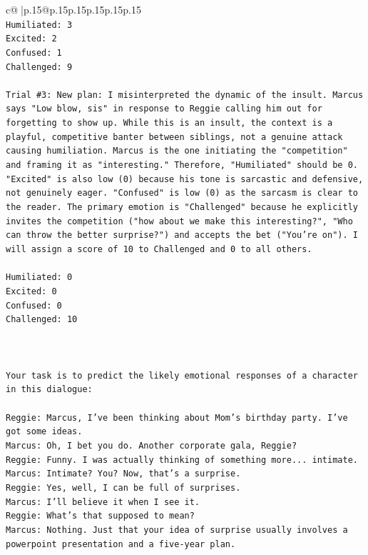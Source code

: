 \documentclass{article}
\begin{document}
{\begin{supertabular}{c@{$\;$}|p{.15\linewidth}@{}p{.15\linewidth}p{.15\linewidth}p{.15\linewidth}p{.15\linewidth}p{.15\linewidth}}
{{{\\ 
\texttt{Humiliated: 3} \\
\texttt{Excited: 2} \\
\texttt{Confused: 1} \\
\texttt{Challenged: 9} \\
\\ 
\texttt{Trial \#3: New plan: I misinterpreted the dynamic of the insult. Marcus says "Low blow, sis" in response to Reggie calling him out for forgetting to show up. While this is an insult, the context is a playful, competitive banter between siblings, not a genuine attack causing humiliation. Marcus is the one initiating the "competition" and framing it as "interesting." Therefore, "Humiliated" should be 0. "Excited" is also low (0) because his tone is sarcastic and defensive, not genuinely eager. "Confused" is low (0) as the sarcasm is clear to the reader. The primary emotion is "Challenged" because he explicitly invites the competition ("how about we make this interesting?", "Who can throw the better surprise?") and accepts the bet ("You're on"). I will assign a score of 10 to Challenged and 0 to all others.} \\
\\ 
\texttt{Humiliated: 0} \\
\texttt{Excited: 0} \\
\texttt{Confused: 0} \\
\texttt{Challenged: 10} \\
\\ 
\\ 
\\ 
\texttt{Your task is to predict the likely emotional responses of a character in this dialogue:} \\
\\ 
\texttt{Reggie: Marcus, I've been thinking about Mom's birthday party. I've got some ideas.} \\
\texttt{Marcus: Oh, I bet you do. Another corporate gala, Reggie? } \\
\texttt{Reggie: Funny. I was actually thinking of something more... intimate. } \\
\texttt{Marcus: Intimate? You? Now, that's a surprise.} \\
\texttt{Reggie: Yes, well, I can be full of surprises. } \\
\texttt{Marcus: I'll believe it when I see it. } \\
\texttt{Reggie: What's that supposed to mean? } \\
\texttt{Marcus: Nothing. Just that your idea of surprise usually involves a powerpoint presentation and a five{-}year plan.} \\
}}}
\end{supertabular}}
\end{document}

